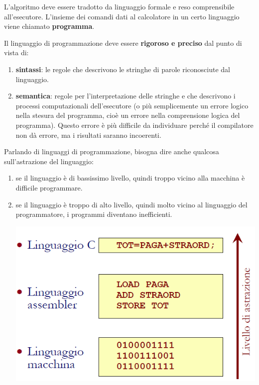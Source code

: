 \documentclass[
  paper=a4,
  oneside  ,captions=tableheading
]{scrbook}
\providecommand{\tightlist}{%
  \setlength{\itemsep}{0pt}\setlength{\parskip}{0pt}}
\begin{document}
L'algoritmo deve essere tradotto da linguaggio formale e reso
comprensibile all'esecutore. L'insieme dei comandi dati al calcolatore
in un certo linguaggio viene chiamato \textbf{programma}.

Il linguaggio di programmazione deve essere \textbf{rigoroso e preciso}
dal punto di vista di:

\begin{enumerate}
\def\labelenumi{\arabic{enumi}.}
\tightlist
\item
  \textbf{sintassi}: le regole che descrivono le stringhe di parole
  riconosciute dal linguaggio.
\item
  \textbf{semantica}: regole per l'interpretazione delle stringhe e che
  descrivono i processi computazionali dell'esecutore (o più
  semplicemente un errore logico nella stesura del programma, cioè un
  errore nella comprensione logica del programma). Questo errore è più
  difficile da individuare perché il compilatore non dà errore, ma i
  risultati saranno incoerenti.
\end{enumerate}

Parlando di linguaggi di programmazione, bisogna dire anche qualcosa
sull'astrazione del linguaggio:

\begin{enumerate}
\def\labelenumi{\arabic{enumi}.}
\item
  se il linguaggio è di bassissimo livello, quindi troppo vicino alla
  macchina è difficile programmare.
\item
  se il linguaggio è troppo di alto livello, quindi molto vicino al
  linguaggio del programmatore, i programmi diventano inefficienti.

  \includegraphics{./image/image-20201111001022024.png}
\end{enumerate}
\end{document}
